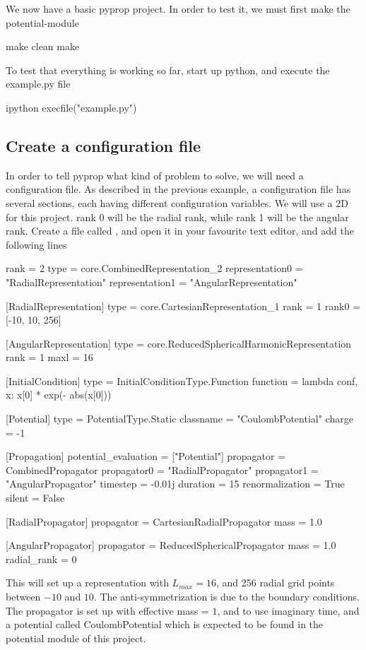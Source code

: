 We now have a basic pyprop project. In order to test it, we must first make the potential-module
\begin{bash}
	make clean
	make
\end{bash}
To test that everything is working so far, start up python, and execute the example.py file
\begin{bash}
 	ipython
	execfile("example.py")
\end{bash}

\subsection{Create a configuration file}
In order to tell pyprop what kind of problem to solve, we will need a configuration file. As described in the previous example, a configuration file has several sections, each having different configuration variables. We will use a 2D  for this project. rank 0 will be the radial rank, while rank 1 will be the angular rank. Create a file called , and open it in your favourite text editor, and add the following lines
\begin{python}
[Representation]
rank = 2
type = core.CombinedRepresentation_2
representation0 = "RadialRepresentation"
representation1 = "AngularRepresentation"

[RadialRepresentation]
type = core.CartesianRepresentation_1
rank = 1
rank0 = [-10, 10, 256]

[AngularRepresentation]
type = core.ReducedSphericalHarmonicRepresentation
rank = 1
maxl = 16

[InitialCondition]
type = InitialConditionType.Function
function = lambda conf, x: x[0] * exp(- abs(x[0]))

[Potential]
type = PotentialType.Static
classname = "CoulombPotential"
charge = -1

[Propagation]
potential_evaluation = ["Potential"] 
propagator = CombinedPropagator
propagator0 = "RadialPropagator"
propagator1 = "AngularPropagator"
timestep = -0.01j
duration = 15
renormalization = True
silent = False

[RadialPropagator]
propagator = CartesianRadialPropagator
mass = 1.0

[AngularPropagator]
propagator = ReducedSphericalPropagator
mass = 1.0
radial_rank = 0
\end{python}
This will set up a representation with $L_{max} = 16$, and 256 radial grid points between $-10$ and $10$. The anti-symmetrization is due to the boundary conditions. The propagator is set up with effective mass = $1$, and to use imaginary time, and a potential called CoulombPotential which is expected to be found in the potential module of this project.

